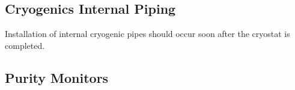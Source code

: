 
\subsection{Cryogenics Internal Piping}
\label{sec:fdgen-slow-cryo-install-pipes}


Installation of internal cryogenic pipes should occur soon after the cryostat is completed.





\subsection{Purity Monitors}
\label{sec:fdgen-slow-cryo-instal-pm}

